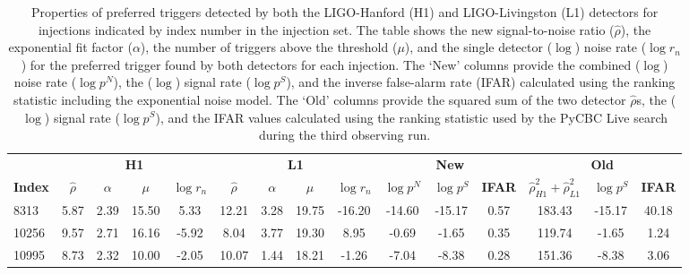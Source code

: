 \begin{table}
    \centering
    \small
    \setlength{\tabcolsep}{5pt}
    \begin{tabular}{lcccccccccccccc}
        \toprule
        & \multicolumn{4}{c}{\textbf{H1}} & \multicolumn{4}{c}{\textbf{L1}} & \multicolumn{3}{c}{\textbf{New}} & \multicolumn{3}{c}{\textbf{Old}} \\
        \cmidrule(lr){2-5} \cmidrule(lr){6-9} \cmidrule(lr){10-12} \cmidrule(lr){13-15}
        \textbf{Index} & \textbf{$\hat{\rho}$} & \textbf{$\alpha$} & \textbf{$\mu$} & \textbf{$\log r_n$} & \textbf{$\hat{\rho}$} & \textbf{$\alpha$} & \textbf{$\mu$} & \textbf{$\log r_n$} & \textbf{$\log p^{N}$} & \textbf{$\log p^{S}$} & \textbf{IFAR} & \textbf{$\hat{\rho}_{H1}^{2} + \hat{\rho}_{L1}^{2}$} & \textbf{$\log p^{S}$} & \textbf{IFAR} \\
        \midrule
        8313  & 5.87 & 2.39 & 15.50 & 5.33 & 12.21 & 3.28 & 19.75 & -16.20 & -14.60 & -15.17 & 0.57 & 183.43 & -15.17 & 40.18 \\
        
        10256 & 9.57 & 2.71 & 16.16 & -5.92 & 8.04 & 3.77 & 19.30 & 8.95 & -0.69 & -1.65 & 0.35 & 119.74 & -1.65 & 1.24 \\
        
        10995 & 8.73 & 2.32 & 10.00 & -2.05 & 10.07 & 1.44 & 18.21 & -1.26 & -7.04 & -8.38 & 0.28 & 151.36 & -8.38 & 3.06 \\
        \bottomrule
    \end{tabular}
    \caption{Properties of preferred triggers detected by both the LIGO-Hanford (H1) and LIGO-Livingston (L1) detectors for injections indicated by index number in the injection set. The table shows the new signal-to-noise ratio ($\hat{\rho}$), the exponential fit factor ($\alpha$), the number of triggers above the threshold ($\mu$), and the single detector ($\log$) noise rate ($\log r_n$) for the preferred trigger found by both detectors for each injection. The `New' columns provide the combined ($\log$) noise rate ($\log p^{N}$), the ($\log$) signal rate ($\log p^{S}$), and the inverse false-alarm rate (IFAR) calculated using the ranking statistic including the exponential noise model. The `Old' columns provide the squared sum of the two detector $\hat{\rho}$s, the ($\log$) signal rate ($\log p^{S}$), and the IFAR values calculated using the ranking statistic used by the PyCBC Live search during the third observing run.}
    \label{5:tab:bottom-right-rank-stat}
\end{table}

